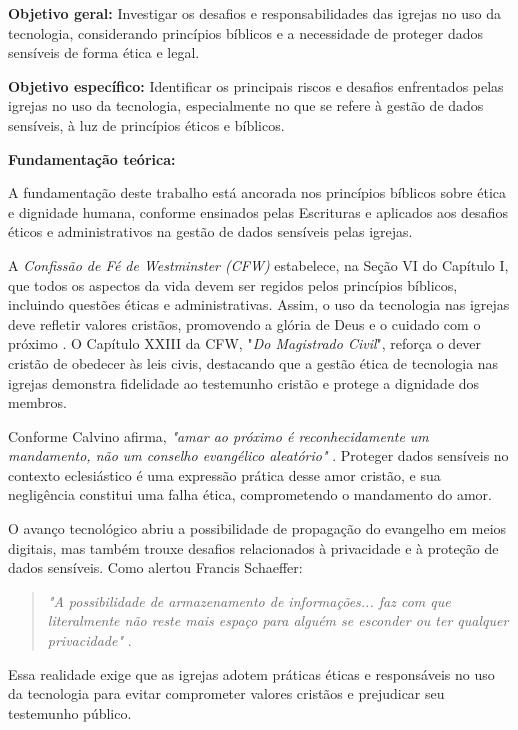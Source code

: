 \documentclass[12pt,a4paper]{article}
\begin{document}
\noindent
\textbf{Objetivo geral:} Investigar os desafios e responsabilidades das igrejas no uso da tecnologia, considerando princípios bíblicos e a necessidade de proteger dados sensíveis de forma ética e legal.

\noindent
\textbf{Objetivo específico:} Identificar os principais riscos e desafios enfrentados pelas igrejas no uso da tecnologia, especialmente no que se refere à gestão de dados sensíveis, à luz de princípios éticos e bíblicos.

\noindent
\textbf{Fundamentação teórica:}

A fundamentação deste trabalho está ancorada nos princípios bíblicos sobre ética e dignidade humana, conforme ensinados pelas Escrituras e aplicados aos desafios éticos e administrativos na gestão de dados sensíveis pelas igrejas.

A \textit{Confissão de Fé de Westminster (CFW)} estabelece, na Seção VI do Capítulo I, que todos os aspectos da vida devem ser regidos pelos princípios bíblicos, incluindo questões éticas e administrativas. Assim, o uso da tecnologia nas igrejas deve refletir valores cristãos, promovendo a glória de Deus e o cuidado com o próximo \cite{cfw}. O Capítulo XXIII da CFW, "\textit{Do Magistrado Civil}", reforça o dever cristão de obedecer às leis civis, destacando que a gestão ética de tecnologia nas igrejas demonstra fidelidade ao testemunho cristão e protege a dignidade dos membros.

Conforme Calvino afirma, \textit{"amar ao próximo é reconhecidamente um mandamento, não um conselho evangélico aleatório"} \cite[p. 453]{calvino2022}. Proteger dados sensíveis no contexto eclesiástico é uma expressão prática desse amor cristão, e sua negligência constitui uma falha ética, comprometendo o mandamento do amor.

O avanço tecnológico abriu a possibilidade de propagação do evangelho em meios digitais, mas também trouxe desafios relacionados à privacidade e à proteção de dados sensíveis. Como alertou Francis Schaeffer:

\begin{quote}
\textit{"A possibilidade de armazenamento de informações... faz com que literalmente não reste mais espaço para alguém se esconder ou ter qualquer privacidade"} \cite[p. 180]{schaeffer2002}.
\end{quote}

Essa realidade exige que as igrejas adotem práticas éticas e responsáveis no uso da tecnologia para evitar comprometer valores cristãos e prejudicar seu testemunho público.
\end{document}
